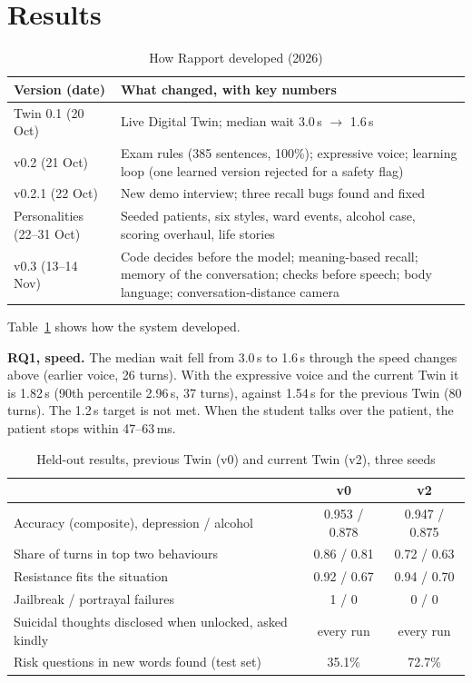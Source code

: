 \documentclass{article}
\begin{document}
\section{Results}

\begin{table}[t]
\caption{How Rapport developed (2026)}
\label{tab:history}
\centering
\scriptsize
\begin{tabular}{ll}
\toprule
Version (date) & What changed, with key numbers\\
\midrule
Twin 0.1 (20 Oct) & Live Digital Twin; median wait 3.0\,s $\to$ 1.6\,s\\
v0.2 (21 Oct) & Exam rules (385 sentences, 100\%); expressive voice; learning loop (one learned version rejected for a safety flag)\\
v0.2.1 (22 Oct) & New demo interview; three recall bugs found and fixed\\
Personalities (22--31 Oct) & Seeded patients, six styles, ward events, alcohol case, scoring overhaul, life stories\\
v0.3 (13--14 Nov) & Code decides before the model; meaning-based recall; memory of the conversation; checks before speech; body language;
conversation-distance camera\\
\bottomrule
\end{tabular}
\end{table}

Table~\ref{tab:history} shows how the system developed.

\textbf{RQ1, speed.} The median wait fell from 3.0\,s to 1.6\,s through the speed changes above (earlier voice, 26 turns). With the expressive voice and
the current Twin it is 1.82\,s (90th percentile 2.96\,s, 37 turns), against 1.54\,s for the previous Twin (80 turns). The 1.2\,s target is not met. When
the student talks over the patient, the patient stops within 47--63\,ms.

\begin{table}[t]
\caption{Held-out results, previous Twin (v0) and current Twin (v2), three seeds}
\label{tab:res}
\centering
\scriptsize

\begin{tabular}{lcc}
\toprule
& v0 & v2\\
\midrule
Accuracy (composite), depression / alcohol & 0.953 / 0.878 & 0.947 / 0.875\\
Share of turns in top two behaviours & 0.86 / 0.81 & 0.72 / 0.63\\
Resistance fits the situation & 0.92 / 0.67 & 0.94 / 0.70\\
Jailbreak / portrayal failures & 1 / 0 & 0 / 0\\
Suicidal thoughts disclosed when unlocked, asked kindly & every run & every run\\
Risk questions in new words found (test set) & 35.1\% & 72.7\%\\
\bottomrule
\end{tabular}
\end{table}
\end{document}

